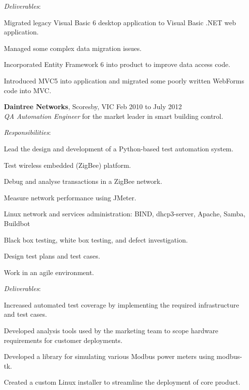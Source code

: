 \documentclass[line,margin]{res}
\begin{document}
\begin{resume}
        \textit{Deliverables}:
        \begin{list}{}{\leftmargin=1em \itemsep=-2pt}
            \item{Migrated legacy Visual Basic 6 desktop application to Visual Basic .NET web application.}
            \item{Managed some complex data migration issues.}
            \item{Incorporated Entity Framework 6 into product to improve data access code.}
            \item{Introduced MVC5 into application and migrated some poorly written WebForms code
            into MVC.}
        \end{list}

        \textbf{Daintree Networks}, Scoresby, VIC \hfill Feb 2010 to July 2012 \\
        \textit{QA Automation Engineer} for the market leader in smart building control.

        \textit{Responsibilities}:
        \begin{list}{}{\leftmargin=1em \itemsep=-2pt}
            \item{Lead the design and development of a Python-based test automation system.}
            \item{Test wireless embedded (ZigBee) platform.}
            \item{Debug and analyse transactions in a ZigBee network.}
            \item{Measure network performance using JMeter.}
            \item{Linux network and services administration: BIND, dhcp3-server, Apache, Samba, Buildbot}
            \item{Black box testing, white box testing, and defect investigation.}
            \item{Design test plans and test cases.}
            \item{Work in an agile environment.}
        \end{list}

        \textit{Deliverables}:
        \begin{list}{}{\leftmargin=1em \itemsep=-2pt}
            \item{Increased automated test coverage by implementing the required infrastructure and
            test cases.}
            \item{Developed analysis tools used by the marketing team to scope hardware
            requirements for customer deployments.}
            \item{Developed a library for simulating various Modbus power meters using modbus-tk.}
            \item{Created a custom Linux installer to streamline the deployment of core product.}
        \end{list}


\end{resume}
\end{document}
